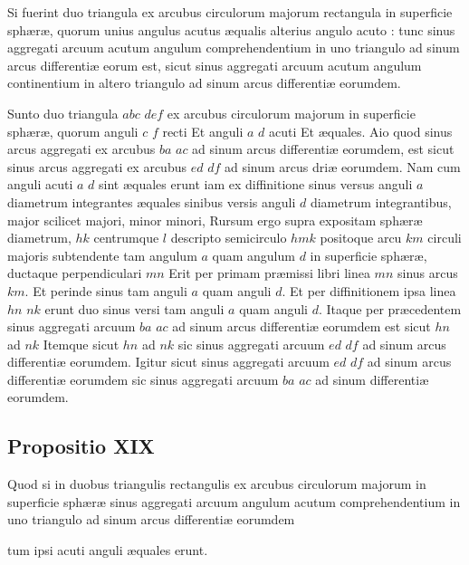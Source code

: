\documentclass[11pt,a4paper]{article}
\begin{document}
Si fuerint duo triangula ex arcubus circulorum majorum rectangula in superficie sphæræ, quorum unius angulus acutus æqualis alterius angulo acuto : tunc sinus aggregati arcuum acutum angulum comprehendentium in uno triangulo ad sinum arcus differentiæ eorum est, sicut sinus aggregati arcuum acutum angulum continentium in altero triangulo ad sinum arcus differentiæ eorumdem.

Sunto duo triangula $abc$ $def$ ex arcubus circulorum majorum in superficie sphæræ, quorum anguli $c$ $f$ recti Et anguli $a$ $d$ acuti Et æquales. Aio quod sinus arcus aggregati ex arcubus  $ba$ $ac$ ad sinum arcus differentiæ eorumdem, est sicut sinus arcus aggregati ex arcubus $ed$ $df$ ad sinum arcus driæ eorumdem. Nam cum anguli acuti $a$ $d$ sint æquales  erunt iam ex diffinitione sinus versus anguli $a$ diametrum integrantes æquales sinibus versis anguli $d$ diametrum integrantibus, major scilicet majori, minor minori, Rursum ergo supra expositam sphæræ diametrum, $hk$ centrumque $l$ descripto semicirculo $hmk$ positoque arcu $km$ circuli majoris subtendente tam angulum $a$ quam angulum $d$ in superficie sphæræ, ductaque perpendiculari $mn$ Erit per primam præmissi libri linea $mn$ sinus arcus $km$. Et perinde sinus tam anguli $a$ quam anguli $d$. Et per diffinitionem ipsa linea $hn$ $nk$ erunt duo sinus versi tam anguli $a$ quam anguli $d$. Itaque per præcedentem sinus aggregati arcuum $ba$ $ac$ ad sinum arcus differentiæ eorumdem est sicut $hn$ ad $nk$ Itemque sicut $hn$ ad $nk$ sic sinus aggregati arcuum $ed$ $df$ ad sinum arcus differentiæ eorumdem. Igitur sicut sinus aggregati arcuum $ed$ $df$ ad sinum arcus differentiæ eorumdem sic sinus aggregati arcuum $ba$ $ac$ ad sinum differentiæ eorumdem.

\subsection*{Propositio XIX}

Quod si in duobus triangulis rectangulis ex arcubus circulorum majorum in superficie sphæræ sinus aggregati arcuum angulum acutum comprehendentium in uno triangulo ad sinum arcus differentiæ eorumdem

tum ipsi acuti anguli æquales erunt.
\end{document}
